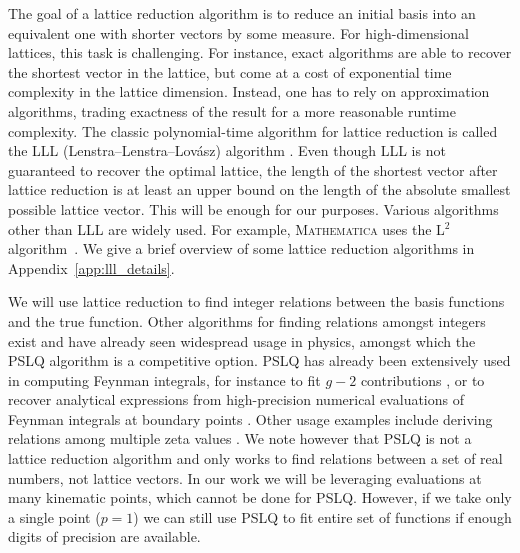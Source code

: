 \documentclass[a4paper,11pt]{article}
\begin{document}
The goal of a lattice reduction algorithm is to reduce an initial basis into an equivalent one with shorter vectors by some measure. For high-dimensional lattices, this task is challenging. For instance, exact algorithms are able to recover the shortest vector in the lattice, but come at a cost of exponential time complexity in the lattice dimension. Instead,  one has to rely on approximation algorithms, trading exactness of the result for a more reasonable runtime complexity. The classic polynomial-time algorithm for lattice reduction is called the LLL (Lenstra–Lenstra–Lovász) algorithm \cite{Lenstra:1982}. 
Even though LLL is not guaranteed to recover the optimal lattice, the length of the shortest vector after lattice reduction is at least an upper bound on the length of the absolute smallest possible lattice vector. This will be enough for our purposes. 
Various algorithms other than LLL are widely used. For example, \textsc{Mathematica} uses the L$^2$ algorithm~\cite{Nguyen:2001}. We give a brief overview of some lattice reduction algorithms in Appendix~\ref{app:lll_details}. 

We will use lattice reduction to find integer relations between the basis functions and the true function. Other algorithms for finding relations amongst integers exist and have already seen widespread usage in physics, amongst which the PSLQ algorithm \cite{Ferguson:1992} is a competitive option. PSLQ has already been extensively used in computing Feynman integrals, for instance to fit $g-2$ contributions \cite{Laporta:2017okg}, or to recover analytical expressions from high-precision numerical evaluations of Feynman integrals at boundary points \cite{Chachamis:2008fx,Lee:2010cga,Chicherin:2017dob, Lee:2018ojn, Agarwal:2021zft, Canko:2024ara}. Other usage examples include deriving relations among multiple zeta values \cite{Acres:2021sss}. We note however that PSLQ is not a lattice reduction algorithm and only works to find relations between a set of real numbers, not lattice vectors.  In our work we will be leveraging evaluations at many kinematic points, which cannot be done for PSLQ. However, if we take only a single point ($p=1$) we can still use PSLQ to fit entire set of functions if enough digits of precision are available. 
\end{document}
